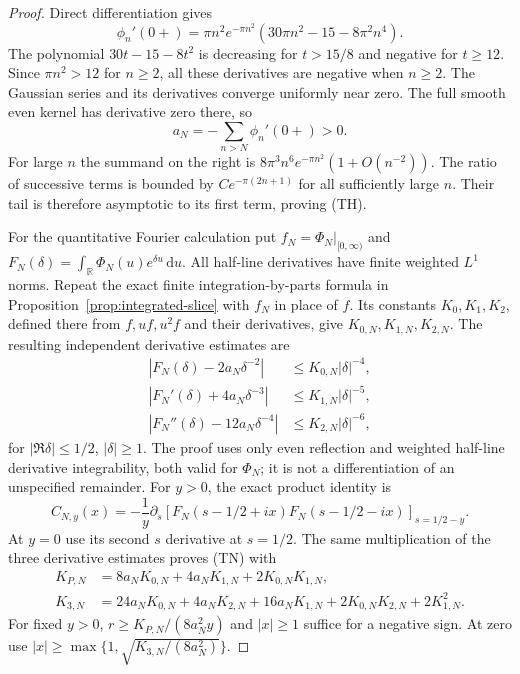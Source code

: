 \documentclass[11pt]{article}
\theoremstyle{remark}\newtheorem{remark}[theorem]{Remark}
\newcommand{\R}{\mathbb R}
\newcommand{\dd}{\,\mathrm d}
\begin{document}
\begin{proof}
Direct differentiation gives
\[
 \phi_n'(0+)=\pi n^2e^{-\pi n^2}
              (30\pi n^2-15-8\pi^2n^4).
\]
The polynomial $30t-15-8t^2$ is decreasing for $t>15/8$
and negative for $t\ge12$. Since $\pi n^2>12$ for $n\ge2$,
all these derivatives are negative when $n\ge2$.
The Gaussian series and its derivatives converge uniformly
near zero. The full smooth even kernel has derivative zero
there, so
\[
 a_N=-\sum_{n>N}\phi_n'(0+)>0.
\]
For large $n$ the summand on the right is
$8\pi^3n^6e^{-\pi n^2}(1+O(n^{-2}))$.
The ratio of successive terms is bounded by
$C e^{-\pi(2n+1)}$ for all sufficiently large $n$.
Their tail is therefore asymptotic to its first term,
proving (TH).

For the quantitative Fourier calculation put
$f_N=\Phi_N|_{[0,\infty)}$ and
$F_N(\delta)=\int_\R\Phi_N(u)e^{\delta u}\dd u$.
All half-line derivatives have finite weighted $L^1$ norms.
Repeat the exact finite integration-by-parts formula in
Proposition~\ref{prop:integrated-slice} with $f_N$ in place
of $f$. Its constants $K_0,K_1,K_2$, defined there from
$f,uf,u^2f$ and their derivatives, give $K_{0,N},K_{1,N},K_{2,N}$.
The resulting independent derivative estimates are
\[
 \begin{split}
 |F_N(\delta)-2a_N\delta^{-2}|&\le K_{0,N}|\delta|^{-4},\\
 |F_N'(\delta)+4a_N\delta^{-3}|&\le K_{1,N}|\delta|^{-5},\\
 |F_N''(\delta)-12a_N\delta^{-4}|&\le K_{2,N}|\delta|^{-6},
 \end{split}
\]
for $|\Re\delta|\le1/2$, $|\delta|\ge1$.
The proof uses only even reflection and weighted
half-line derivative integrability, both valid for $\Phi_N$;
it is not a differentiation of an unspecified remainder.
For $y>0$, the exact product identity is
\[
 C_{N,y}(x)=-\frac1y\partial_s
    [F_N(s-1/2+ix)F_N(s-1/2-ix)]_{s=1/2-y}.
\]
At $y=0$ use its second $s$ derivative at $s=1/2$.
The same multiplication of the three derivative estimates
proves (TN) with
\[
 \begin{split}
 K_{P,N}&=8a_NK_{0,N}+4a_NK_{1,N}+2K_{0,N}K_{1,N},\\
 K_{3,N}&=24a_NK_{0,N}+4a_NK_{2,N}+16a_NK_{1,N}
                    +2K_{0,N}K_{2,N}+2K_{1,N}^2.
 \end{split}
\]
For fixed $y>0$, $r\ge K_{P,N}/(8a_N^2y)$ and $|x|\ge1$
suffice for a negative sign. At zero use
$|x|\ge\max\{1,\sqrt{K_{3,N}/(8a_N^2)}\}$.


\end{proof}
\end{document}
